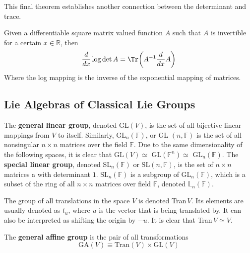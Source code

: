   This final theorem establishes another connection between the determinant and trace. 

  \begin{theorem}
    Given a differentiable square matrix valued function $A$ such that $A$ is invertible for a certain $x \in \mathbb{R}$, then 
    \begin{equation}
      \frac{d}{d x} \log{\det{A}} = \Tr \bigg( A^{-1} \frac{d}{d x} A \bigg)
    \end{equation}
    Where the log mapping is the inverse of the exponential mapping of matrices. 
  \end{theorem}

\subsection{Lie Algebras of Classical Lie Groups}

  \begin{definition}
    \label{def:general-linear-group-2}
    The \textbf{general linear group}, denoted GL$(V)$, is the set of all bijective linear mappings from $V$ to itself. Similarly, GL$_{n}(\mathbb{F})$, or GL $(n, \mathbb{F})$ is the set of all nonsingular $n \times n$ matrices over the field $\mathbb{F}$. Due to the same dimensionality of the following spaces, it is clear that GL$(V) \simeq$ GL$(\mathbb{F}^{n}) \simeq$ GL$_{n}(\mathbb{F})$. The \textbf{special linear group}, denoted SL$_{n} (\mathbb{F})$ or SL$(n, \mathbb{F})$, is the set of $n\times n$ matrices a with determinant $1$. SL$_{n}(\mathbb{F})$ is a subgroup of GL$_{n}(\mathbb{F})$, which is a subset of the ring of all $n \times n$ matrices over field $\mathbb{F}$, denoted $\mathbb{L}_{n}(\mathbb{F})$. 
  \end{definition}

  \begin{definition}
    \label{def:translation-group}
    The group of all translations in the space $V$ is denoted Tran$\,V$. Its elements are usually denoted as $t_{u}$, where $u$ is the vector that is being translated by. It can also be interpreted as shifting the origin by $-u$. It is clear that Tran$\,V \simeq V$. 
  \end{definition}

  \begin{definition}
    \label{def:general-affine-group}
    The \textbf{general affine group} is the pair of all transformations
    \begin{equation}
      \text{GA} (V) \equiv \text{Tran}(V) \times \text{GL}(V)
    \end{equation}
  \end{definition}

